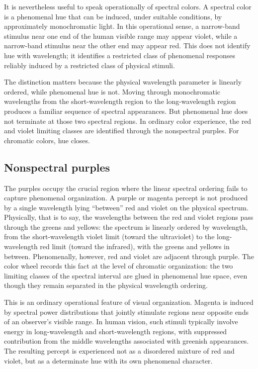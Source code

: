 \documentclass[preprint,12pt,authoryear]{elsarticle}
\theoremstyle{plain}
\theoremstyle{definition}
\theoremstyle{remark}
\begin{document}
It is nevertheless useful to speak operationally of spectral colors. A spectral color is a phenomenal hue that can be induced, under suitable conditions, by approximately monochromatic light. In this operational sense, a narrow-band stimulus near one end of the human visible range may appear violet, while a narrow-band stimulus near the other end may appear red. This does not identify hue with wavelength; it identifies a restricted class of phenomenal responses reliably induced by a restricted class of physical stimuli.

The distinction matters because the physical wavelength parameter is linearly ordered, while phenomenal hue is not. Moving through monochromatic wavelengths from the short-wavelength region to the long-wavelength region produces a familiar sequence of spectral appearances. But phenomenal hue does not terminate at those two spectral regions. In ordinary color experience, the red and violet limiting classes are identified through the nonspectral purples. For chromatic colors, hue closes.

\subsection{Nonspectral purples}
\label{subsec:nonspectral-purples}

\noindent The purples occupy the crucial region where the linear spectral ordering fails to capture phenomenal organization. A purple or magenta percept is not produced by a single wavelength lying ``between'' red and violet on the physical spectrum. Physically, that is to say, the wavelengths between the red and violet regions pass through the greens and yellows: the spectrum is linearly ordered by wavelength, from the short-wavelength violet limit (toward the ultraviolet) to the long-wavelength red limit (toward the infrared), with the greens and yellows in between. Phenomenally, however, red and violet are adjacent through purple. The color wheel records this fact at the level of chromatic organization: the two limiting classes of the spectral interval are glued in phenomenal hue space, even though they remain separated in the physical wavelength ordering.

This is an ordinary operational feature of visual organization. Magenta is induced by spectral power distributions that jointly stimulate regions near opposite ends of an observer's visible range. In human vision, such stimuli typically involve energy in long-wavelength and short-wavelength regions, with suppressed contribution from the middle wavelengths associated with greenish appearances. The resulting percept is experienced not as a disordered mixture of red and violet, but as a determinate hue with its own phenomenal character.
\end{document}
